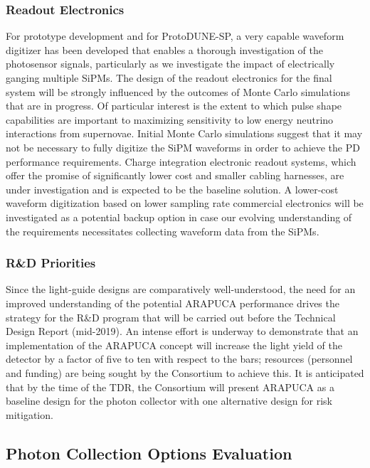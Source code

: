 \subsubsection{Readout Electronics} 
For prototype development and for ProtoDUNE-SP, a very capable waveform digitizer has been developed that enables a thorough investigation of the photosensor signals, particularly as we investigate the impact of electrically ganging multiple SiPMs. The design of the readout electronics for the final system will be strongly influenced by the outcomes of Monte Carlo simulations that are in progress. Of particular interest is the extent to which pulse  shape capabilities are important to maximizing sensitivity to low energy neutrino interactions from supernovae. 
Initial Monte Carlo simulations suggest that it may not be necessary to fully digitize the SiPM waveforms in order to achieve the PD performance requirements.  Charge integration electronic readout systems, which offer the promise of significantly lower cost and smaller cabling harnesses, are under investigation and is expected to be the baseline solution.
A lower-cost waveform digitization based on lower sampling rate commercial electronics will be investigated as a potential backup option in case our evolving understanding of the requirements necessitates collecting waveform data from the SiPMs.

\subsubsection{R\&D Priorities} 
Since the light-guide designs are comparatively well-understood, the need for an improved understanding of the potential ARAPUCA performance drives the strategy for the R\&D program that will be carried out before the Technical Design Report (mid-2019). 
An intense effort is underway to demonstrate that an implementation of the ARAPUCA concept will increase the light yield of the detector by a factor of five to ten  with respect to the bars; resources (personnel and funding)  are being sought by the Consortium to achieve this.  
It is anticipated that by the time of the TDR, the Consortium will present ARAPUCA as a baseline design for the photon collector with one alternative design for risk mitigation.  


\subsection{Photon Collection Options Evaluation}

